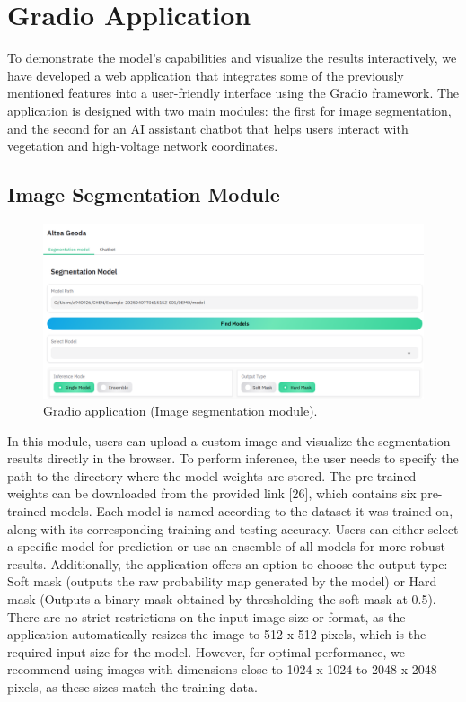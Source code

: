 \chapter{Gradio Application}
To demonstrate the model's capabilities and visualize the results interactively, we have developed a web application that integrates some of the previously mentioned features into a user-friendly interface using the Gradio framework. The application is designed with two main modules: the first for image segmentation, and the second for an AI assistant chatbot that helps users interact with vegetation and high-voltage network coordinates.
\section{Image Segmentation Module}
\begin{figure}[H]
 \centering
 \includegraphics[scale=0.55]{IMAGENES/Gradio_app_segmentation1.png}
 \captionsetup{font=large}
 \caption {Gradio application (Image segmentation module).}
\end{figure}
In this module, users can upload a custom image and visualize the segmentation results directly in the browser. To perform inference, the user needs to specify the path to the directory where the model weights are stored. The pre-trained weights can be downloaded from the provided link [26], which contains six pre-trained models. Each model is named according to the dataset it was trained on, along with its corresponding training and testing accuracy. Users can either select a specific model for prediction or use an ensemble of all models for more robust results. Additionally, the application offers an option to choose the output type: Soft mask (outputs the raw probability map generated by the model) or Hard mask (Outputs a binary mask obtained by thresholding the soft mask at 0.5). There are no strict restrictions on the input image size or format, as the application automatically resizes the image to 512 x 512 pixels, which is the required input size for the model. However, for optimal performance, we recommend using images with dimensions close to 1024 x 1024 to 2048 x 2048 pixels, as these sizes match the training data.
